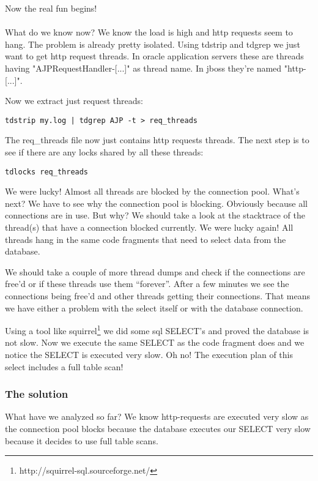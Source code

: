 Now the real fun begins!
\\\\
What do we know now?
We know the load is high and http requests seem to hang.
The problem is already pretty isolated.
Using tdstrip and tdgrep we just want to get http request threads.
In oracle application servers these are threads having "AJPRequestHandler-[...]" as thread name.
In jboss they're named "http-[...]".

Now we extract just request threads:
\begin{verbatim}
tdstrip my.log | tdgrep AJP -t > req_threads
\end{verbatim}

The req\_threads file now just contains http requests threads.
The next step is to see if there are any locks shared by all these threads:
\begin{verbatim}
tdlocks req_threads
\end{verbatim}

We were lucky!
Almost all threads are blocked by the connection pool.
What's next?
We have to see why the connection pool is blocking.
Obviously because all connections are in use.
But why?
We should take a look at the stacktrace of the thread(s) that have a connection blocked currently.
We were lucky again!
All threads hang in the same code fragments that need to select data from the database.

We should take a couple of more thread dumps and check if the connections are free'd or if these threads use them ``forever''.
After a few minutes we see the connections being free'd and other threads getting their connections.
That means we have either a problem with the select itself or with the database connection.

Using a tool like squirrel\footnote{http://squirrel-sql.sourceforge.net/} we did some sql SELECT's and proved the database is not slow.
Now we execute the same SELECT as the code fragment does and we notice the SELECT is executed very slow.
Oh no!
The execution plan of this select includes a full table scan!

\subsubsection{The solution}

What have we analyzed so far?
We know http-requests are executed very slow as the connection pool blocks because the database executes our SELECT very slow because it decides to use full table scans.


